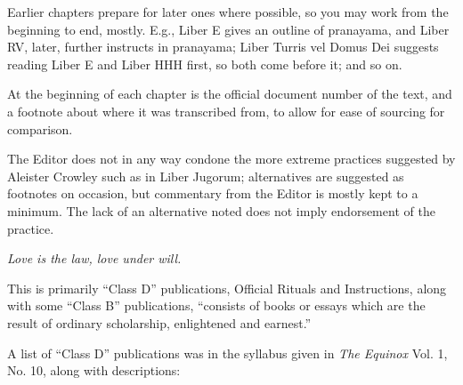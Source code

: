 Earlier chapters prepare for later ones where possible, so you may work from the beginning to end, mostly. E.g., Liber E gives an outline of pranayama, and Liber RV, later, further instructs in pranayama; Liber Turris vel Domus Dei suggests reading Liber E and Liber HHH first, so both come before it; and so on.

At the beginning of each chapter is the official document number of the text, and a footnote about where it was transcribed from, to allow for ease of sourcing for comparison.

The Editor does not in any way condone the more extreme practices suggested by Aleister Crowley such as in Liber Jugorum; alternatives are suggested as footnotes on occasion, but commentary from the Editor is mostly kept to a minimum. The lack of an alternative noted does not imply endorsement of the practice.

\textit{Love is the law, love under will.}




This is primarily \enquote{Class D} publications, Official Rituals and Instructions, along with some \enquote{Class B} publications, \enquote{consists of books or essays which are the result of ordinary scholarship, enlightened and earnest.}

A list of \enquote{Class D} publications was in the syllabus given in \textit{The Equinox} Vol. 1, No. 10, along with descriptions:

